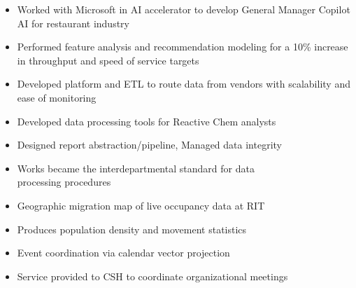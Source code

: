 \documentclass[10pt,a4paper,ragged2e,withhyper]{altacv}
\begin{document}
\begin{paracol}{2}


\begin{itemize}
    \item Worked with Microsoft in AI accelerator to develop General Manager Copilot AI for restaurant industry
    \item Performed feature analysis and recommendation modeling for a 10\% increase in throughput and speed of service targets
    \item Developed platform and ETL to route data from vendors with scalability and ease of monitoring
\end{itemize}

\divider

\begin{itemize}
    \item Developed data processing tools for Reactive Chem analysts
    \item Designed report abstraction/pipeline, Managed data integrity
    \item Works became the interdepartmental standard for data\\processing procedures
\end{itemize}


\begin{itemize}
    \item Geographic migration map of live occupancy data at RIT
    \item Produces population density and movement statistics
\end{itemize}

\divider

\begin{itemize}
    \item Event coordination via calendar vector projection
    \item Service provided to CSH to coordinate organizational meetings
\end{itemize}


\end{paracol}
\end{document}
